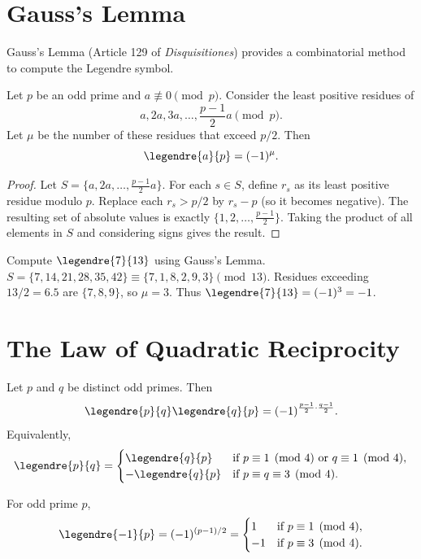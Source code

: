 \section{Gauss's Lemma}

Gauss's Lemma (Article 129 of \textit{Disquisitiones}) provides a combinatorial method to compute the Legendre symbol.

\begin{theorem}
Let $p$ be an odd prime and $a \not\equiv 0 \pmod{p}$. Consider the least positive residues of
\[
a, 2a, 3a, \ldots, \frac{p-1}{2}a \pmod{p}.
\]
Let $\mu$ be the number of these residues that exceed $p/2$. Then
\[
\legendre{a}{p} = (-1)^\mu.
\]
\end{theorem}

\begin{proof}
Let $S = \{a, 2a, \ldots, \frac{p-1}{2}a\}$. For each $s \in S$, define $r_s$ as its least positive residue modulo $p$. Replace each $r_s > p/2$ by $r_s - p$ (so it becomes negative). The resulting set of absolute values is exactly $\{1, 2, \ldots, \frac{p-1}{2}\}$. Taking the product of all elements in $S$ and considering signs gives the result.
\end{proof}

\begin{example}
Compute $\legendre{7}{13}$ using Gauss's Lemma.
$S = \{7, 14, 21, 28, 35, 42\} \equiv \{7, 1, 8, 2, 9, 3\} \pmod{13}$.
Residues exceeding $13/2 = 6.5$ are $\{7, 8, 9\}$, so $\mu = 3$.
Thus $\legendre{7}{13} = (-1)^3 = -1$.
\end{example}

\section{The Law of Quadratic Reciprocity}

\begin{theorem}
Let $p$ and $q$ be distinct odd primes. Then
\[
\legendre{p}{q} \legendre{q}{p} = (-1)^{\frac{p-1}{2} \cdot \frac{q-1}{2}}.
\]
Equivalently,
\[
\legendre{p}{q} = 
\begin{cases}
\legendre{q}{p} & \text{if } p \equiv 1 \pmod{4} \text{ or } q \equiv 1 \pmod{4}, \\
-\legendre{q}{p} & \text{if } p \equiv q \equiv 3 \pmod{4}.
\end{cases}
\]
\end{theorem}

\begin{supplement}
For odd prime $p$,
\[
\legendre{-1}{p} = (-1)^{(p-1)/2} = 
\begin{cases}
1 & \text{if } p \equiv 1 \pmod{4}, \\
-1 & \text{if } p \equiv 3 \pmod{4}.
\end{cases}
\]
\end{supplement}


